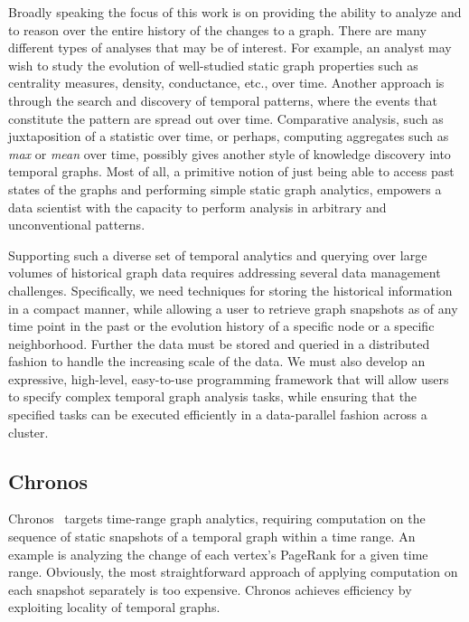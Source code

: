 \documentclass{svjour3}
\begin{document}
Broadly speaking the focus of this work is on providing the ability to analyze and to reason over the entire history of 
the changes to a graph. There are many different types of analyses that may be of interest. 
For example, an analyst may wish to study the evolution of well-studied static graph properties such
as centrality measures, density, conductance, etc., over time. Another approach is through the search and 
discovery of temporal patterns, where the events that constitute the pattern are spread out over time. 
Comparative analysis, such as juxtaposition of a statistic over time, or perhaps, computing 
aggregates such as \textit{max} or \textit{mean} over time, possibly gives another style of knowledge discovery 
into temporal graphs. Most of all, a primitive notion of just being able to access past states of the graphs 
and performing simple static graph analytics, empowers a data scientist with the capacity to 
perform analysis in arbitrary and unconventional patterns.

Supporting such a diverse set of temporal analytics and querying over large volumes of historical graph data 
requires addressing several data management challenges. Specifically, we need techniques for storing
the historical information in a compact manner, while allowing a user to retrieve graph snapshots as of any
time point in the past or the evolution history of a specific node or a specific neighborhood. Further the
data must be stored and queried in a distributed fashion to handle the increasing scale of the data.
We must also develop an expressive, high-level, easy-to-use programming framework that will allow users to 
specify complex temporal graph analysis tasks, while ensuring that the specified tasks can be executed efficiently 
in a data-parallel fashion across a cluster.

\subsection{Chronos}\label{sec:chronos}

Chronos~\cite{chronos} targets time-range graph analytics, requiring computation on the sequence of static snapshots of a temporal graph within a time range. An example is analyzing the change of each vertex's PageRank for a given time range. Obviously, the most straightforward approach of applying computation on each snapshot separately is too expensive. Chronos achieves efficiency by exploiting locality of temporal graphs.
\end{document}
